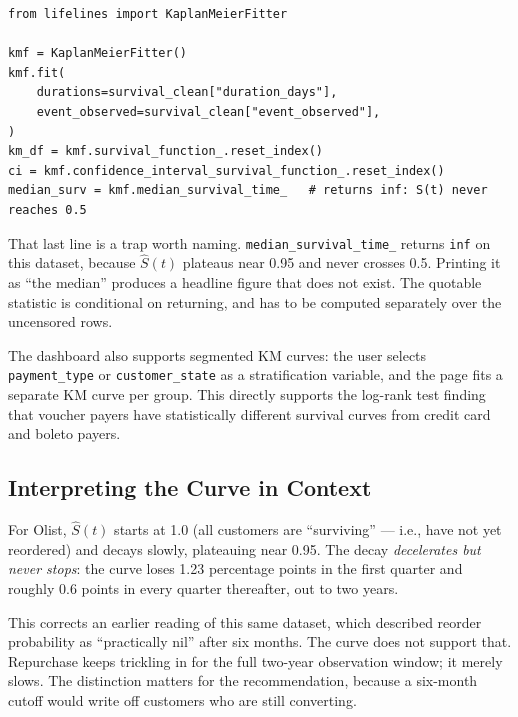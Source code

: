 \begin{lstlisting}[style=python, caption={KM fitting, originally in \filepath{streamlit/pages/2\_retencion\_cohortes.py}; now precomputed by \filepath{data-pipeline/05\_build\_web\_json.py}}]
from lifelines import KaplanMeierFitter

kmf = KaplanMeierFitter()
kmf.fit(
    durations=survival_clean["duration_days"],
    event_observed=survival_clean["event_observed"],
)
km_df = kmf.survival_function_.reset_index()
ci = kmf.confidence_interval_survival_function_.reset_index()
median_surv = kmf.median_survival_time_   # returns inf: S(t) never reaches 0.5
\end{lstlisting}

\begin{keyinsight}
That last line is a trap worth naming. \texttt{median\_survival\_time\_} returns
\texttt{inf} on this dataset, because $\hat{S}(t)$ plateaus near 0.95 and never
crosses 0.5. Printing it as ``the median'' produces a headline figure that does
not exist. The quotable statistic is conditional on returning, and has to be
computed separately over the uncensored rows.
\end{keyinsight}

The dashboard also supports segmented KM curves: the user selects
\texttt{payment\_type} or \texttt{customer\_state} as a stratification variable,
and the page fits a separate KM curve per group. This directly supports the
log-rank test finding that voucher payers have statistically different survival
curves from credit card and boleto payers.

\subsection{Interpreting the Curve in Context}

For Olist, $\hat{S}(t)$ starts at 1.0 (all customers are ``surviving'' ---
i.e., have not yet reordered) and decays slowly, plateauing near 0.95. The decay
\emph{decelerates but never stops}: the curve loses 1.23 percentage points in the
first quarter and roughly 0.6 points in every quarter thereafter, out to two
years.

\begin{keyinsight}
This corrects an earlier reading of this same dataset, which described reorder
probability as ``practically nil'' after six months. The curve does not support
that. Repurchase keeps trickling in for the full two-year observation window; it
merely slows. The distinction matters for the recommendation, because a
six-month cutoff would write off customers who are still converting.
\end{keyinsight}

